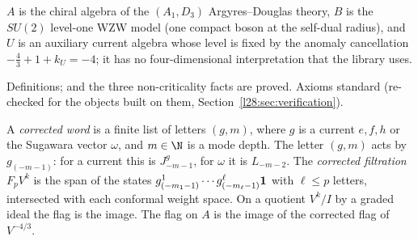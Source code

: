 \begin{physics}
$A$ is the chiral algebra of the $(A_1,D_3)$ Argyres--Douglas theory, $B$ is the $SU(2)$ level-one WZW model (one compact
boson at the self-dual radius), and $U$ is an auxiliary current algebra whose level is fixed by the anomaly cancellation
$-\tfrac43+1+k_U=-4$; it has no four-dimensional interpretation that the library uses.
\end{physics}

\begin{status}
Definitions;  and the three non-criticality facts are proved. Axioms standard (re-checked for the
objects built on them, Section~\ref{l28:sec:verification}).
\end{status}

\begin{definition}\label{l28:def:corrected}
A \emph{corrected word} is a finite list of letters $(g,m)$, where $g$ is a current $e,f,h$ or the Sugawara vector $\omega$,
and $m\in\N$ is a mode depth. The letter $(g,m)$ acts by $g_{(-m-1)}$: for a current this is $J^g_{-m-1}$, for $\omega$ it is
$L_{-m-2}$. The \emph{corrected filtration} $F_pV^k$ is the span of the states $g^1_{(-m_1-1)}\cdots g^\ell_{(-m_\ell-1)}\mathbf 1$
with $\ell\le p$ letters, intersected with each conformal weight space. On a quotient $V^k/I$ by a graded ideal the flag is the
image. The flag on $A$ is the image of the corrected flag of $V^{-4/3}$.
\end{definition}


